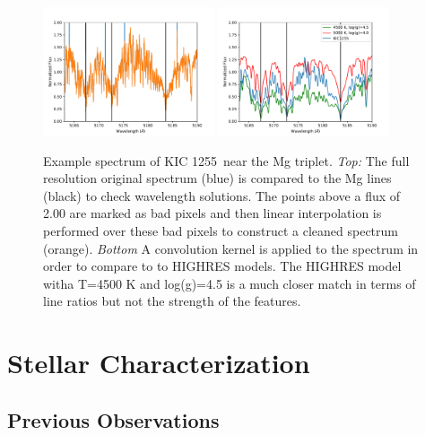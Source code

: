 \documentclass[preprint]{aastex61}
\newcommand{\shStar}{KIC 1255}
\begin{document}
\begin{figure}
\begin{centering}
\includegraphics[width=0.45\textwidth]{images/subaru/Mg_triplet_spec_interp.pdf}
\includegraphics[width=0.45\textwidth]{images/subaru/Mg_triplet_spec.pdf}
\caption{Example spectrum of \shStar\ near the Mg triplet.
{\it Top:} The full resolution original spectrum (blue) is compared to the Mg lines (black) to check wavelength solutions.
The points above a flux of 2.00 are marked as bad pixels and then linear interpolation is performed over these bad pixels to construct a cleaned spectrum (orange).
{\it Bottom} A convolution kernel is applied to the spectrum in order to compare to to HIGHRES models.
The HIGHRES model witha T=4500 K and log(g)=4.5 is a much closer match in terms of line ratios but not the strength of the features.}\label{fig:mgTriplet}
\end{centering}
\end{figure}

\section{Stellar Characterization}
\subsection{Previous Observations}
\end{document}
